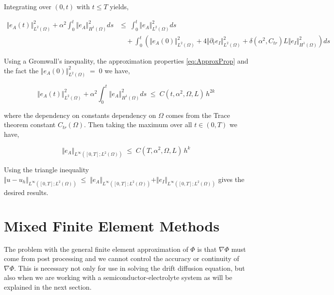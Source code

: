 \documentclass[10pt]{report}
\numberwithin{equation}{section}
\begin{document}
Integrating over $(0,t)$ with $t \leq T$ yields,

\begin{align}
\Vert e_{A}(t) \Vert^{2}_{L^{2}(\Omega)}  + \alpha^{2} \int_{0}^{t}   \Vert e_{A} \Vert_{H^{1}(\Omega)}^{2} ds  &\leq \; \int_{0}^{t}  \Vert  e_{A} \Vert_{L^{2}(\Omega)}^{2} ds \\ 
 & \quad + \int_{0}^{t} \left( \Vert e_{A}(0) \Vert^{2}_{L^{2}(\Omega)} + 4 \Vert \partial_{t} e_{I} \Vert^{2}_{L^{2}(\Omega)} + \delta \left( \alpha^{2}, C_{tr} \right) L \Vert e_{I} \Vert_{H^{1}(\Omega)}^{2}  \right) ds 
\end{align}


Using a Gromwall's inequality, the approximation properties \eqref{eq:ApproxProp} and the fact the  $\Vert e_{A}(0) \Vert_{L^{2}(\Omega)}^{2} \; = \; 0$ we have,


\begin{equation}
\Vert e_{A}(t) \Vert_{L^{2}(\Omega)}^{2}  + \alpha^{2}\int_{0}^{t} \Vert e_{A} \Vert_{H^{1}(\Omega)}^{2} ds  \; \leq \; C(t,\alpha^{2}, \Omega,L) \, h^{2k}
\end{equation}



where the dependency on constants dependency on $\Omega$ comes from the Trace theorem constant $C_{tr}(\Omega)$.  Then taking the maximum over all $t \in (0,T)$ we have,

\begin{equation}
\Vert e_{A} \Vert_{L^{\infty}([0,T];L^{2}(\Omega))}  \; \leq \; C(T,\alpha^{2}, \Omega,L) \, h^{k}
\end{equation}



Using the triangle inequality $\Vert u - u_{h}  \Vert_{L^{\infty}([0,T];L^{2}(\Omega))}  \; \leq \; \Vert e_{A} \Vert_{L^{\infty}([0,T];L^{2}(\Omega))} + \Vert e_{I} \Vert_{L^{\infty}([0,T];L^{2}(\Omega))}$ gives the desired results.


\newpage

\chapter{Mixed Finite Element Methods}


\noindent
The problem with the general finite element approximation of $\Phi$ is that $\nabla \Phi$ must come from post processing and we cannot control the accuracy or continuity of $\nabla \Phi$.  This is necessary not only for use in solving the drift diffusion equation, but also when we are working with a semiconductor-electrolyte system as will be explained in the next section.
\end{document}
